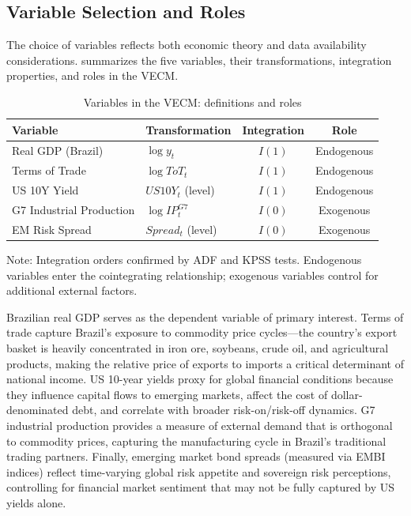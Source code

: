 \documentclass[12pt,a4paper]{article}
\numberwithin{equation}{section}
\theoremstyle{definition}
\theoremstyle{remark}
\begin{document}
\subsection{Variable Selection and Roles}

The choice of variables reflects both economic theory and data availability considerations.  summarizes the five variables, their transformations, integration properties, and roles in the VECM.

\begin{table}[ht]
\centering
\begin{threeparttable}
\caption{Variables in the VECM: definitions and roles}
\label{tab:variable_roles}
\begin{tabular}{@{}llcc@{}}
\toprule
\textbf{Variable} & \textbf{Transformation} & \textbf{Integration} & \textbf{Role} \\
\midrule
Real GDP (Brazil) & $\log y_t$ & $I(1)$ & Endogenous \\
Terms of Trade & $\log ToT_t$ & $I(1)$ & Endogenous \\
US 10Y Yield & $US10Y_t$ (level) & $I(1)$ & Endogenous \\
G7 Industrial Production & $\log IP^{G7}_t$ & $I(0)$ & Exogenous \\
EM Risk Spread & $Spread_t$ (level) & $I(0)$ & Exogenous \\
\bottomrule
\end{tabular}
\begin{tablenotes}\footnotesize
\item Note: Integration orders confirmed by ADF and KPSS tests. Endogenous variables enter the cointegrating relationship; exogenous variables control for additional external factors.
\end{tablenotes}
\end{threeparttable}
\end{table}

Brazilian real GDP serves as the dependent variable of primary interest. Terms of trade capture Brazil's exposure to commodity price cycles---the country's export basket is heavily concentrated in iron ore, soybeans, crude oil, and agricultural products, making the relative price of exports to imports a critical determinant of national income. US 10-year yields proxy for global financial conditions because they influence capital flows to emerging markets, affect the cost of dollar-denominated debt, and correlate with broader risk-on/risk-off dynamics. G7 industrial production provides a measure of external demand that is orthogonal to commodity prices, capturing the manufacturing cycle in Brazil's traditional trading partners. Finally, emerging market bond spreads (measured via EMBI indices) reflect time-varying global risk appetite and sovereign risk perceptions, controlling for financial market sentiment that may not be fully captured by US yields alone.
\end{document}
